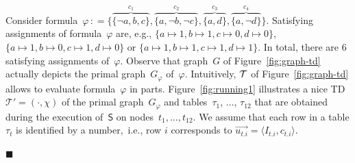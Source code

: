 \documentclass{llncs}
\newcommand{\eqdef}{\ensuremath{\,\mathrel{\mathop:}=}}
\newcommand{\TTT}{\mathcal{T}}
\newcommand{\algo}[1]{\ensuremath{\mathsf{#1}}}
\newcommand{\tab}[1]{\ensuremath{\tau_{#1}}}
\renewenvironment{example}{\begin{EXa}}{\hfill\ensuremath{\blacksquare}\end{EXa}}
\begin{document}
\vspace{-1em}
\begin{example}\label{ex:running0}
  Consider
  formula~$\varphi\eqdef \{\overbrace{\{\neg a, b, c\}}^{c_1},
  \overbrace{\{a, \neg b, \neg c\}}^{c_2}, \overbrace{\{a,
    d\}}^{c_3}, \overbrace{\{a, \neg d\}}^{c_4}\}$.
  Satisfying assignments of formula~$\varphi$ are, e.g., 
  $\{a\mapsto 1,b\mapsto 1, c\mapsto 0, d\mapsto 0\}$, $\{a\mapsto 1, b\mapsto 0,c\mapsto 1, d\mapsto 0\}$ or $\{a\mapsto 1, b\mapsto 1,c\mapsto 1, d\mapsto 1\}$.
  In total, there are 6 satisfying assignments of~$\varphi$. 
%
%
%
%
%
%
  Observe that graph~$G$ of Figure~\ref{fig:graph-td} actually depicts
  the primal graph~$G_\varphi$ of~$\varphi$.
  Intuitively, ${\cal T}$ of Figure~\ref{fig:graph-td} allows to
  evaluate formula~$\varphi$ in parts. 
%
%
%
%
%
%
  Figure~\ref{fig:running1} illustrates a nice TD~$\TTT'=(\cdot, \chi)$ of the 
  primal graph~$G_\varphi$ and
  tables~$\tab{1}$, $\ldots$, $\tab{12}$ that are obtained during the
  execution of~${\algo{S}}$ on nodes~$t_1,\ldots,t_{12}$.
  We assume that each row in a table $\tab{t}$ is identified by a
  number,~i.e., row $i$ corresponds to
  $\vec{u_{t.i}} = \langle I_{t.i}, c_{t.i} \rangle$.


\end{example}
\end{document}

